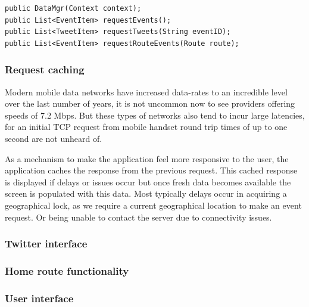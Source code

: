 \begin{lstlisting}
public DataMgr(Context context);
public List<EventItem> requestEvents();
public List<TweetItem> requestTweets(String eventID);
public List<EventItem> requestRouteEvents(Route route);
\end{lstlisting}

\subsubsection{Request caching}
Modern mobile data networks have increased data-rates to an incredible level
over the last number of years, it is not uncommon now to see providers offering
speeds of 7.2 Mbps. But these types of networks also tend to incur large
latencies, for an initial TCP request from mobile handset round trip times of
up to one second are not unheard of.

As a mechanism to make the application feel more responsive to the user, the
application caches the response from the previous request. This cached response
is displayed if delays or issues occur but once fresh data becomes available
the screen is populated with this data. Most typically delays occur in
acquiring a geographical lock, as we require a current geographical location to
make an event request. Or being unable to contact the server due to
connectivity issues.

\subsubsection{Twitter interface}
\subsubsection{Home route functionality}
\subsubsection{User interface}
